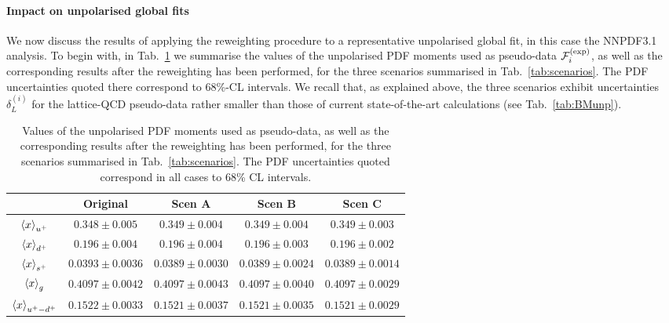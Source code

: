 \paragraph{Impact on unpolarised global fits}
\label{subsec:upolfits}
%
We now discuss the results of applying the reweighting procedure
to a representative unpolarised
global fit, in this case the NNPDF3.1 analysis.
%
To begin with, in Tab.~\ref{tab:unpolmomentsrw} we summarise
the values of the unpolarised PDF moments
used as pseudo-data $\mathcal{F}_i^{(\rm exp)}$,
as well as the corresponding results
  after the reweighting has been performed, for the
three scenarios summarised 
in Tab.~\ref{tab:scenarios}.
%
The PDF uncertainties quoted there correspond to 68\%-CL intervals.
%
We recall that, as explained above, the three scenarios exhibit
uncertainties $\delta_L^{(i)}$ for the lattice-QCD pseudo-data rather smaller
than those of current state-of-the-art
calculations (see Tab.~\ref{tab:BMunp}).

\begin{table}[t]
  \centering
  \renewcommand{\arraystretch}{1.4} 
\begin{tabular}{c||c|c|c|c}
  \hline &  Original  & Scen A  &  Scen B  &  Scen C  \\
  \hline
  \hline
  $\left\langle x\right\rangle_{u^+}$     &   $0.348 \pm  0.005$    &  $ 0.349 \pm 0.004$     &
  $ 0.349 \pm 0.004$   &  $ 0.349 \pm 0.003$   \\
  $\left\langle x\right\rangle_{d^+}$     &   $0.196\pm  0.004$     & $0.196 \pm0.004$       &
  $0.196 \pm0.003$ &   $0.196 \pm0.002$ \\
  $\left\langle x\right\rangle_{s^+}$     &   $0.0393 \pm 0.0036$   &  $0.0389\pm 0.0030$   &
 $0.0389\pm 0.0024$   &   $0.0389\pm 0.0014$  \\
  $\left\langle x\right\rangle_{g}$       &   $0.4097\pm 0.0042$    &  $0.4097 \pm 0.0043$    &
   $0.4097 \pm 0.0040$  &    $0.4097 \pm 0.0029$  \\
  $\left\langle x\right\rangle_{u^+-d^+}$  &   $0.1522 \pm 0.0033$   &  $0.1521 \pm 0.0037$   &
   $0.1521 \pm 0.0035$ &    $0.1521 \pm 0.0029$ \\
  \hline
\end{tabular}
\caption{\small Values of the unpolarised PDF moments
  used as pseudo-data, as well as the corresponding results
  after the reweighting has been performed, for the
three scenarios summarised 
in Tab.~\ref{tab:scenarios}.
%
The PDF uncertainties quoted correspond in all cases to 68\%
CL intervals.
\label{tab:unpolmomentsrw}
}
\end{table}

